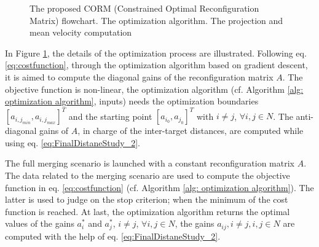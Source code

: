 \begin{figure}[!h]
\begin{center}
\end{center}
\caption{The proposed CORM (Constrained Optimal Reconfiguration Matrix) flowchart.  The optimization algorithm.  The projection and mean velocity computation}
\label{fig:CormAlgo}

\end{figure} 
















In Figure \ref{fig:CormAlgo}, the details of the optimization process are illustrated. Following eq. \ref{eq:costfunction}, through the optimization algorithm based on gradient descent, it is aimed to compute the diagonal gains of the reconfiguration matrix $A$. The objective function is non-linear, the optimization algorithm (cf. Algorithm \ref{alg: optimization algorithm}, inputs) needs the optimization boundaries $[{a}_{i,j_{min}}, {a}_{i,j_{max}}]^T$  and the starting point $[a_{i_0}, a_{j_0}]^T$ with $i \neq j $, $\forall i,j\in {N}$. The anti-diagonal gains of $A$, in charge of the inter-target distances, are computed while using eq. \ref{eq:FinalDistaneStudy_2}. 

The full merging scenario is launched with a constant reconfiguration matrix $A$. The data related to the merging scenario are used to compute the objective function in eq. \ref{eq:costfunction} (cf. Algorithm \ref{alg: optimization algorithm}). The latter is used to judge on the stop criterion; when the minimum of the cost function is reached. At last, the optimization algorithm returns the optimal values of the gains $a_i^*$ and $a_j^*$, $i \neq j $, $\forall i,j\in {N}$, the gains $a_{ij}, i\neq j,  i,j\in {N}$ are computed with the help of eq. \ref{eq:FinalDistaneStudy_2}.




